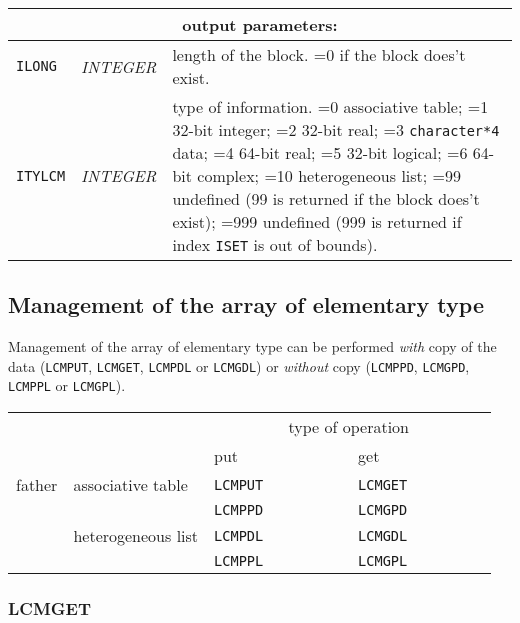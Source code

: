 \vskip 0.8cm

\noindent
\begin{tabular}{|p{1.5cm}|p{3cm}|p{10cm}|}
\hline
\multicolumn{3}{|c|}{\bf output parameters:} \\
\hline
{\tt ILONG} & {\it INTEGER} & length of the block. =0 if the block does't exist. \\
\hline
{\tt ITYLCM} & {\it INTEGER} & type of information. =0 associative table; =1 32-bit integer; 
                                    =2 32-bit real; =3 {\tt character*4} data; 
				    =4 64-bit real; =5 32-bit logical; =6 64-bit complex; =10 heterogeneous list; 
				    =99 undefined (99 is returned if the block does't exist);
				    =999 undefined (999 is returned if index {\tt ISET} is out of bounds). \\
\hline
\end{tabular}

\vskip 0.8cm

\subsection{Management of the array of elementary type}

Management of the array of elementary type can be performed {\sl with} copy of the data ({\tt LCMPUT}, {\tt LCMGET}, {\tt LCMPDL} or
{\tt LCMGDL}) or {\sl without} copy ({\tt LCMPPD}, {\tt LCMGPD}, {\tt LCMPPL} or {\tt LCMGPL}).

\vskip 0.4cm

\begin{center}
\begin{tabular}{|c|l|l|l|}
\cline{3-4}
\multicolumn{2}{c|}{} & \multicolumn{2}{c|}{type of operation} \\
\cline{3-4}
\multicolumn{2}{c|}{} & put~~~~~~~~~~~~~ & get~~~~~~~~~~~~~ \\
\hline
father & associative table & {\tt LCMPUT} & {\tt LCMGET} \\
       &                   & {\tt LCMPPD} & {\tt LCMGPD} \\
\cline{2-4}
       & heterogeneous list & {\tt LCMPDL} & {\tt LCMGDL} \\
       &                   & {\tt LCMPPL} & {\tt LCMGPL} \\
\hline
\end{tabular}
\end{center}

\subsubsection{LCMGET}

